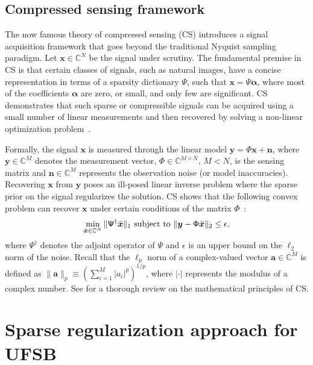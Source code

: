 \documentclass[conference]{IEEEtran}
\begin{document}
\subsection{Compressed sensing framework}
\label{ssec:CS}
The now famous theory of compressed sensing (CS) introduces a signal acquisition framework that goes beyond the traditional Nyquist sampling paradigm\cite{Donoho_TIT_2006,candes06,fornasier11}. Let $\bm{x} \in \mathbb{C}^{N}$ be the signal under scrutiny. The fundamental premise in CS is that certain classes of signals, such as natural images, have a concise representation in terms of a sparsity dictionary $\mathsf{\Psi}$,  such that $\bm{x} = \mathsf{\Psi}\bm{\alpha}$, where most of the coefficients $\bm{\alpha}$ are zero, or small, and only few are significant. CS demonstrates that such sparse or compressible signals can be acquired using a small number of linear measurements and then recovered by solving a non-linear optimization problem~\cite{candes06,Donoho_TIT_2006,fornasier11}. 

Formally, the signal $\bm{x}$ is measured through the linear model $\bm{y}=\mathsf{\Phi}\bm{x}+\bm{n}$, where $\bm{y}\in\mathbb{C}^{M}$ denotes the measurement vector, $\mathsf{\Phi}\in\mathbb{C}^{M\times N}$, $M<N$, is the sensing matrix and $\bm{n}\in\mathbb{C}^{M}$ represents the observation noise (or model inaccuracies). Recovering $\bm{x}$ from $\bm{y}$ poses an ill-posed linear inverse problem where the sparse prior on the signal regularizes the solution. CS shows that the following convex problem can recover $\bm{x}$ under certain conditions of the matrix $\mathsf{\Phi}$~\cite{candes11}:
%
\begin{equation}\label{cs6}
\min_{\bar{\bm{x}}\in\mathbb{C}^{N}}\|\mathsf{\Psi}^{\dagger}\bar{\bm{x}}\|_{1}
\textnormal{ subject to }\| \bm{y}-\mathsf{\Phi}\bar{\bm{x}}\|_{2}\leq\epsilon,
\end{equation}
%
where $\mathsf{\Psi}^{\dagger}$ denotes the adjoint operator of $\mathsf{\Psi}$ and $\epsilon$ is an upper bound on the $\ell_{2}$ norm of the noise. Recall that the $\ell_{p}$ norm of a complex-valued vector $\bm{a}\in\mathbb{C}^{M}$ is defined as $\| \bm{a}\|_{p}\equiv(\sum_{i=1}^{M}|a_{i}|^{p})^{1/p}$, where $|\cdot|$ represents the modulus of a complex number. See \cite{fornasier11} for a thorough review on the mathematical principles of CS.



\section{Sparse regularization approach for UFSB}
\label{sec:S-UFSB}
\end{document}
